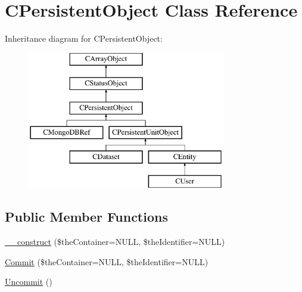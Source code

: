 \hypertarget{class_c_persistent_object}{\section{C\-Persistent\-Object Class Reference}
\label{class_c_persistent_object}
}
Inheritance diagram for C\-Persistent\-Object\-:\begin{figure}[H]
\begin{center}
\leavevmode
\includegraphics[height=6.000000cm]{class_c_persistent_object}
\end{center}
\end{figure}
\subsection*{Public Member Functions}
\begin{DoxyCompactItemize}
\item 
\hyperlink{class_c_persistent_object_a10d0ce97598da33eaf305eb43e418255}{\-\_\-\-\_\-construct} (\$the\-Container=N\-U\-L\-L, \$the\-Identifier=N\-U\-L\-L)
\item 
\hyperlink{class_c_persistent_object_ad076a9a2baf73bba0784deb135a3b7b7}{Commit} (\$the\-Container=N\-U\-L\-L, \$the\-Identifier=N\-U\-L\-L)
\item 
\hyperlink{class_c_persistent_object_a37c897b534e88477a06ec60b89d84450}{Uncommit} ()
\end{DoxyCompactItemize}
